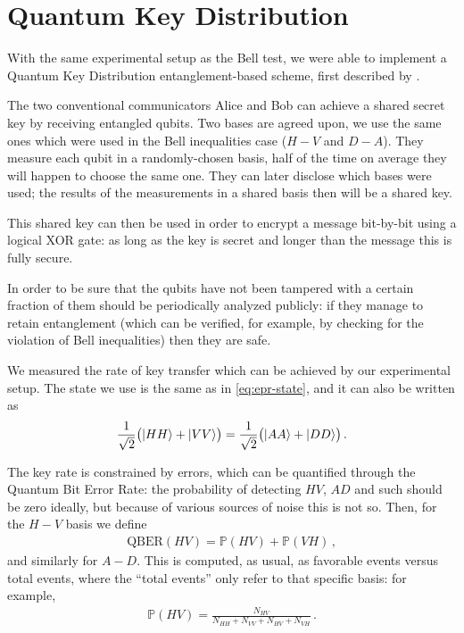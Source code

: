 \documentclass[main.tex]{subfiles}
\begin{document}
\section{Quantum Key Distribution}

With the same experimental setup as the Bell test, we were able to implement a Quantum Key Distribution entanglement-based scheme, first described by \textcite{bennettQuantumCryptographyBell1992}. 

The two conventional communicators Alice and Bob can achieve a shared secret key by receiving entangled qubits. 
Two bases are agreed upon, we use the same ones which were used in the Bell inequalities case (\(H-V\) and \(D-A\)).
They measure each qubit in a randomly-chosen basis, half of the time on average they will happen to choose the same one.
They can later disclose which bases were used; the results of the measurements in a shared basis then will be a shared key. 

This shared key can then be used in order to encrypt a message bit-by-bit using a logical XOR gate: as long as the key is secret and longer than the message this is fully secure.

In order to be sure that the qubits have not been tampered with a certain fraction of them should be periodically analyzed publicly: if they manage to retain entanglement (which can be verified, for example, by checking for the violation of Bell inequalities) then they are safe. 

We measured the rate of key transfer which can be achieved by our experimental setup. 
The state we use is the same as in \eqref{eq:epr-state}, and it can also be written as 
%
\begin{align}
\frac{1}{\sqrt{2}} \qty(\ket{HH} + \ket{VV})
=
\frac{1}{\sqrt{2}} \qty(\ket{AA} + \ket{DD})
\,.
\end{align}

The key rate is constrained by errors, which can be quantified through the Quantum Bit Error Rate: the probability of detecting \(HV\), \(AD\) and such should be zero ideally, but because of various sources of noise this is not so.
Then, for the \(H-V\) basis we define 
%
\begin{align}
\text{QBER}(HV) = \mathbb{P}(HV)+ \mathbb{P}(VH)
\,,
\end{align}
%
and similarly for \(A-D\). This is computed, as usual, as favorable events versus total events, where the ``total events'' only refer to that specific basis: for example, 
%
\begin{align}
\mathbb{P}(HV) = \frac{N_{HV}}{N_{HH} + N_{VV} + N_{HV} + N_{VH}}
\,.
\end{align}
\end{document}
